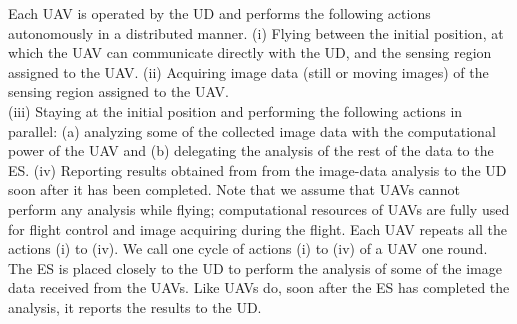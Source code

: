 \documentclass{ieeeaccess}
\begin{document}
Each UAV is operated by the UD and performs the following actions autonomously in a distributed manner.
%
(i) Flying between the initial position, at which the UAV can communicate directly with the UD, and the sensing region assigned to the UAV.
(i\hspace{-.1em}i) Acquiring image data (still or moving images) of the sensing region assigned to the UAV.\\
(i\hspace{-.1em}i\hspace{-.1em}i) Staying at the initial position and performing the following actions in parallel: (a) analyzing some of the collected image data with the computational power of the UAV and (b) delegating the analysis of the rest of the data to the ES.
(i\hspace{-.1em}v) Reporting results obtained from  from the image-data analysis to the UD soon after it has been completed.
%
Note that we assume that UAVs cannot perform any analysis while flying; computational resources of UAVs are fully used for flight control and image acquiring during the flight. Each UAV repeats all the actions (i) to (i\hspace{-.1em}v). We call one cycle of actions (i) to (i\hspace{-.1em}v) of a UAV one round. %
The ES is placed closely to the UD to perform the analysis of some of the image data received from the UAVs.
%
Like UAVs do, soon after the ES has completed the analysis, it reports the results to the UD.
\end{document}
